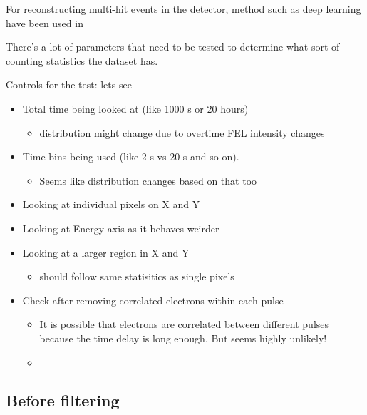 For reconstructing multi-hit events in the detector, method such as deep learning have been used in \cite{knipferDeepLearningbasedSpatiotemporal2024}


There's a lot of parameters that need to be tested to determine what sort of counting statistics the dataset has.

Controls for the test:
lets see
\begin{itemize}
    \item Total time being looked at (like 1000 s or 20 hours)
    \begin{itemize}
        \item distribution might change due to overtime FEL intensity changes
    \end{itemize}
    \item Time bins being used (like 2 s vs 20 s and so on).
    \begin{itemize}
        \item Seems like distribution changes based on that too
    \end{itemize}
    \item Looking at individual pixels on X and Y
    \item Looking at Energy axis as it behaves weirder
    \item Looking at a larger region in X and Y 
    \begin{itemize}
        \item should follow same statisitics as single pixels
    \end{itemize}
    \item Check after removing correlated electrons within each pulse
    \begin{itemize}
        \item It is possible that electrons are correlated between different pulses because the time delay is long enough. But seems highly unlikely!
    \end{itemize}
    \begin{itemize}
        \item 
    \end{itemize}
\end{itemize}


\subsection{Before filtering}

